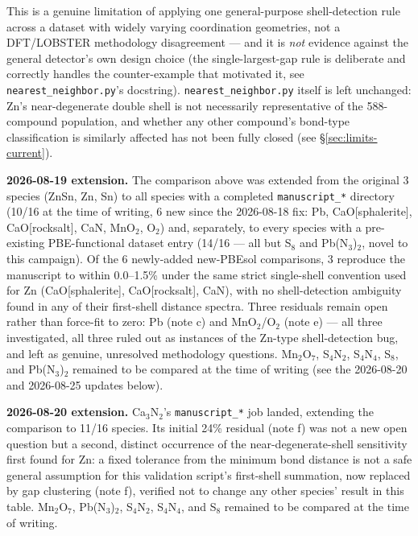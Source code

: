 This is a genuine limitation of applying one general-purpose
shell-detection rule across a dataset with widely varying coordination
geometries, not a DFT/LOBSTER methodology disagreement --- and it is
\emph{not} evidence against the general detector's own design choice
(the single-largest-gap rule is deliberate and correctly handles the
counter-example that motivated it, see \texttt{nearest\_neighbor.py}'s
docstring). \texttt{nearest\_neighbor.py} itself is left unchanged: Zn's
near-degenerate double shell is not necessarily representative of the
588-compound population, and whether any other compound's bond-type
classification is similarly affected has not been fully closed (see
\S\ref{sec:limits-current}).

\textbf{2026-08-19 extension.} The comparison above was extended from
the original 3 species (ZnSn, Zn, Sn) to all species with a completed
\texttt{manuscript\_*} directory (10/16 at the time of writing, 6 new
since the 2026-08-18 fix: Pb, CaO[sphalerite], CaO[rocksalt], CaN,
MnO$_2$, O$_2$) and, separately, to every species with a pre-existing
PBE-functional dataset entry (14/16 --- all but S$_8$ and
Pb(N$_3$)$_2$, novel to this campaign). Of the 6 newly-added
new-PBEsol comparisons, 3 reproduce the manuscript to within
0.0--1.5\% under the same strict single-shell convention used for Zn
(CaO[sphalerite], CaO[rocksalt], CaN), with no shell-detection
ambiguity found in any of their first-shell distance spectra. Three
residuals remain open rather than force-fit to zero: Pb (note c) and
MnO$_2$/O$_2$ (note e) --- all three investigated, all three ruled out
as instances of the Zn-type shell-detection bug, and left as genuine,
unresolved methodology questions. Mn$_2$O$_7$, S$_4$N$_2$, S$_4$N$_4$,
S$_8$, and Pb(N$_3$)$_2$ remained to be compared at the time of
writing (see the 2026-08-20 and 2026-08-25 updates below).

\textbf{2026-08-20 extension.} Ca$_3$N$_2$'s \texttt{manuscript\_*} job
landed, extending the comparison to 11/16 species. Its initial 24\%
residual (note f) was not a new open question but a second, distinct
occurrence of the near-degenerate-shell sensitivity first found for Zn:
a fixed tolerance from the minimum bond distance is not a safe general
assumption for this validation script's first-shell summation, now
replaced by gap clustering (note f), verified not to change any other
species' result in this table. Mn$_2$O$_7$, Pb(N$_3$)$_2$, S$_4$N$_2$,
S$_4$N$_4$, and S$_8$ remained to be compared at the time of writing.

